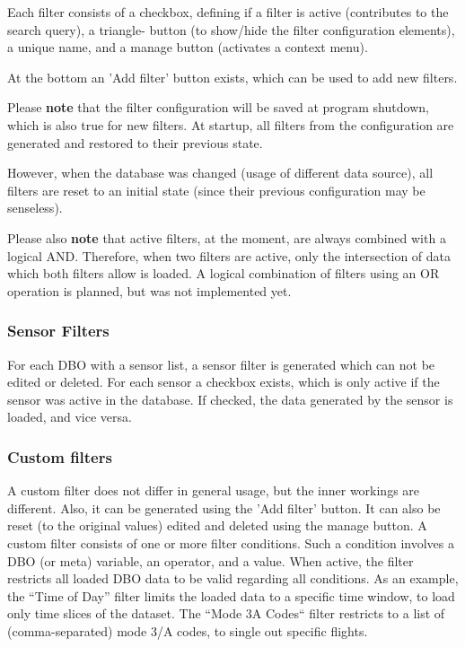 \documentclass[10pt,letterpaper,extrafontsizes]{memoir}
\begin{document}
Each filter consists of a checkbox, defining if a filter is active (contributes to the search query), a triangle-
button (to show/hide the filter configuration elements), a unique name, and a manage button (activates a context menu). 

At the bottom an 'Add filter' button exists, which can be used to add new filters.

Please \textbf{note} that the filter configuration will be saved at program shutdown, which is also true for new
filters.   At  startup,  all  filters  from  the  configuration  are  generated  and  restored  to  their  previous  state.

However, when the database was changed (usage of different data source), all filters are reset to an initial
state (since their previous configuration may be senseless).

Please also \textbf{note} that active filters, at the moment, are always combined with a logical AND. Therefore,
when  two  filters  are  active,  only  the  intersection  of  data  which  both  filters  allow  is  loaded.   A  logical combination of filters using an OR operation is planned, but was not implemented yet.

\subsubsection{Sensor Filters}
For each DBO with a sensor list, a sensor filter is generated which can not be edited or deleted.  For each
sensor a checkbox exists, which is only active if the sensor was active in the database.  If checked, the
data generated by the sensor is loaded, and vice versa.

\subsubsection{Custom filters}
A  custom  filter  does  not  differ  in  general  usage,  but  the  inner  workings  are  different.   Also,  it  can  be generated using the 'Add filter' button. It can also be reset (to the original values) edited and deleted using
the manage button.
A custom filter consists of one or more filter conditions.  Such a condition involves a DBO (or meta) variable,
an operator, and a value.  When active, the filter restricts all loaded DBO data to be valid regarding all
conditions.
As an example, the ``Time of Day'' filter limits the loaded data to a specific time window, to load only time
slices of the dataset.  The ``Mode 3A Codes`` filter restricts to a list of (comma-separated) mode 3/A codes, to single
out specific flights.
\end{document}
